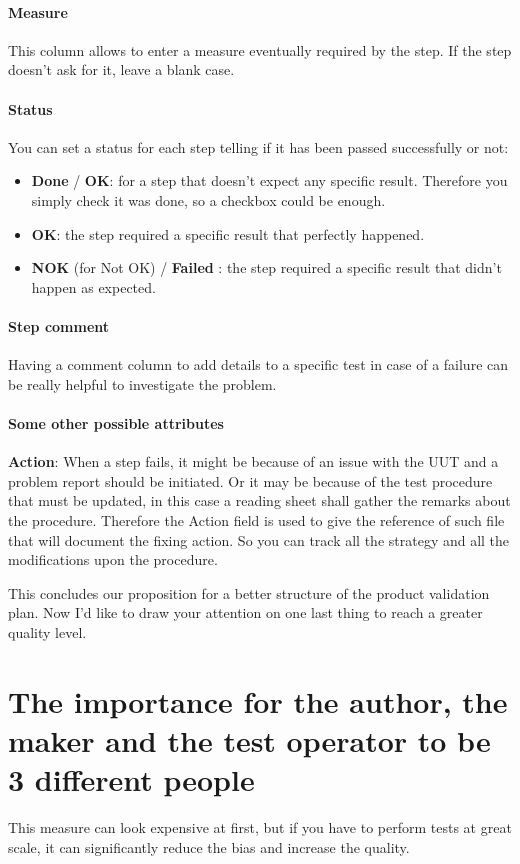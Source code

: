 \paragraph{Measure}
This column allows to enter a measure eventually required by the step. If the step doesn’t ask for it, leave a blank case.

\paragraph{Status}
You can set a status for each step telling if it has been passed successfully or not:

\begin{itemize}
    \item \textbf{Done} / \textbf{OK}: for a step that doesn’t expect any specific result. Therefore you simply check it was done, so a checkbox could be enough.
    \item \textbf{OK}: the step required a specific result that perfectly happened.
    \item \textbf{NOK} (for Not OK) / \textbf{Failed} : the step required a specific result that didn’t happen as expected.
\end{itemize}

\paragraph{Step comment}
Having a comment column to add details to a specific test in case of a failure can be really helpful to investigate the problem.

\paragraph{Some other possible attributes}
\textbf{Action}: When a step fails, it might be because of an issue with the UUT and a problem report should be initiated. Or it may be because of the test procedure that must be updated, in this case a reading sheet shall gather the remarks about the procedure. Therefore the Action field is used to give the reference of such file that will document the fixing action. So you can track all the strategy and all the modifications upon the procedure.

This concludes our proposition for a better structure of the product validation plan. Now I’d like to draw your attention on one last thing to reach a greater quality level.

\section{The importance for the author, the maker and the test operator to be 3 different people}
This measure can look expensive at first, but if you have to perform tests at great scale, it can significantly reduce the bias and increase the quality.

